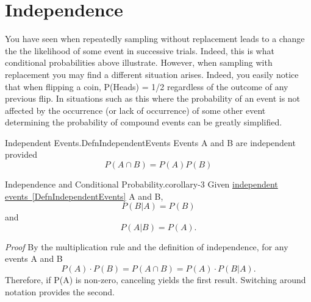 \documentclass[10pt,]{book}
\makeatletter
\renewcommand*{\proofname}{Proof}
\renewenvironment{proof}[1][\proofname]{\par
  \pushQED{\qed}%
  \normalfont \topsep6\p@\@plus6\p@\relax
  \trivlist
  \item\relax
    {\itshape
    #1\@addpunct{.}}\hspace\labelsep\ignorespaces
}{%
  \popQED\endtrivlist\@endpefalse
}
\numberwithin{equation}{section}
\makeatother
\begin{document}
\section[{Independence}]{Independence}\label{section-29}
\hypertarget{p-587}{}%
You have seen when repeatedly sampling without replacement leads to a change the the likelihood of some event in successive trials. Indeed, this is what conditional probabilities above illustrate. However, when sampling with replacement you may find a different situation arises. Indeed, you easily notice that when flipping a coin, P(Heads) = 1/2 regardless of the outcome of any previous flip.  In situations such as this where the probability of an event is not affected by the occurrence (or lack of occurrence) of some other event determining the probability of compound events can be greatly simplified.%
\hypertarget{p-588}{}%
\begin{definition}{Independent Events.}{DefnIndependentEvents}%
\hypertarget{p-589}{}%
Events A and B are independent provided%
\begin{equation*}
P(A \cap B) = P(A) P(B)
\end{equation*}
%
\end{definition}
%
\par
\hypertarget{p-590}{}%
\begin{corollary}{Independence and Conditional Probability.}{}{corollary-3}%
\hypertarget{p-591}{}%
Given \hyperref[DefnIndependentEvents]{independent events~\ref{DefnIndependentEvents}} A and B,%
\begin{equation*}
P(B | A) = P(B)
\end{equation*}
and%
\begin{equation*}
P(A | B) = P(A).
\end{equation*}
%
\end{corollary}
\begin{proof}\hypertarget{proof-22}{}
\hypertarget{p-592}{}%
By the multiplication rule and the definition of independence, for any events A and B%
\begin{equation*}
P(A) \cdot P(B) = P(A \cap B) = P(A) \cdot P(B | A) .
\end{equation*}
Therefore, if P(A) is non-zero, canceling yields the first result. Switching around notation provides the second.%
\end{proof}
%
\par
\hypertarget{p-593}{}%
\end{document}
